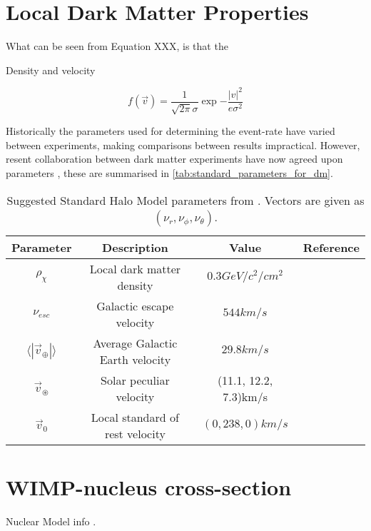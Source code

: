 \section{Local Dark Matter Properties}
\par
What can be seen from Equation XXX, is that the 



\par
Density and velocity


\begin{equation}
    f(\Vec{v}) = \frac{1}{\sqrt{2\pi}\sigma} \exp{-\frac{|v|^2}{e\sigma^2}} 
\end{equation}

\par
Historically the parameters used for determining the event-rate have varied between experiments, making comparisons between results impractical.
However, resent collaboration between dark matter experiments have now agreed upon parameters \cite{standard_halo_model_conventions_ref}, these are summarised in \autoref{tab:standard_parameters_for_dm}.

\begin{table}[!htbp]
    \centering
    \begin{tabular}{c|c|c|c}
        Parameter                               & Description               & Value             & Reference \\ \hline
        $\rho_\chi$                             & Local dark matter density & $0.3GeV/c^2/cm^2$ &            \\
        $\nu_{esc}$                             & Galactic escape velocity  & $544km/s$ &            \\
        $\langle|\Vec{v}_{\oplus}|\rangle$      & Average Galactic Earth velocity & $29.8km/s$ &            \\
        $\Vec{v}_{\circledast}$ & Solar peculiar velocity & (11.1, 12.2, 7.3)km/s &            \\
        $\Vec{v}_0$ & Local standard of rest velocity & $(0,238,0)km/s$ &            
         
    \end{tabular}
    \caption{Suggested Standard Halo Model parameters from \cite{standard_halo_model_conventions_ref}. Vectors are given as $(\nu_r,\nu_\phi,\nu_\theta)$.}
    \label{tab:standard_parameters_for_dm}
\end{table}



\section{WIMP-nucleus cross-section}
\par
Nuclear Model info \cite{wimp_nuclear_model_ref}.


